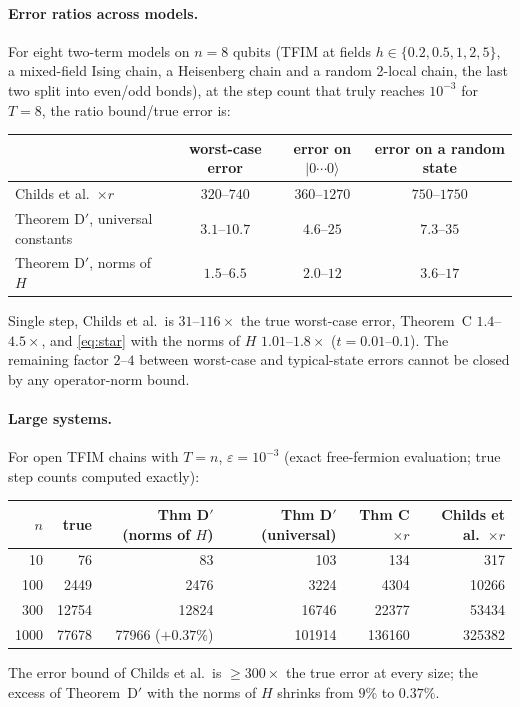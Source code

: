 \documentclass[11pt]{article}
\theoremstyle{plain}
\theoremstyle{definition}
\theoremstyle{remark}
\begin{document}
\paragraph{Error ratios across models.} For eight two-term models on $n=8$ qubits (TFIM at fields
$h\in\{0.2,0.5,1,2,5\}$, a mixed-field Ising chain, a Heisenberg chain and a random 2-local chain, the
last two split into even/odd bonds), at the step count that truly reaches $10^{-3}$ for $T=8$, the
ratio bound/true error is:
\begin{center}\small
\begin{tabular}{@{}lccc@{}}
\toprule
& worst-case error & error on $\lvert0\cdots0\rangle$ & error on a random state\\
\midrule
Childs et al.\ $\times r$ & $320$--$740$ & $360$--$1270$ & $750$--$1750$\\
Theorem D$'$, universal constants & $3.1$--$10.7$ & $4.6$--$25$ & $7.3$--$35$\\
Theorem D$'$, norms of $H$ & $1.5$--$6.5$ & $2.0$--$12$ & $3.6$--$17$\\
\bottomrule
\end{tabular}
\end{center}
Single step, Childs et al.\ is $31$--$116\times$ the true worst-case error, Theorem~C $1.4$--$4.5\times$,
and \eqref{eq:star} with the norms of $H$ $1.01$--$1.8\times$ ($t=0.01$--$0.1$). The remaining factor
$2$--$4$ between worst-case and typical-state errors cannot be closed by any operator-norm bound.

\paragraph{Large systems.} For open TFIM chains with $T=n$, $\varepsilon=10^{-3}$ (exact free-fermion
evaluation; true step counts computed exactly):
\begin{center}\small
\begin{tabular}{@{}rrrrrr@{}}
\toprule
$n$ & true & Thm D$'$ (norms of $H$) & Thm D$'$ (universal) & Thm C $\times r$ & Childs et al.\ $\times r$\\
\midrule
10 & 76 & 83 & 103 & 134 & 317\\
100 & 2449 & 2476 & 3224 & 4304 & 10266\\
300 & 12754 & 12824 & 16746 & 22377 & 53434\\
1000 & 77678 & 77966 ($+0.37\%$) & 101914 & 136160 & 325382\\
\bottomrule
\end{tabular}
\end{center}
The error bound of Childs et al.\ is $\ge300\times$ the true error at every size; the excess of
Theorem~D$'$ with the norms of $H$ shrinks from $9\%$ to $0.37\%$.
\end{document}
